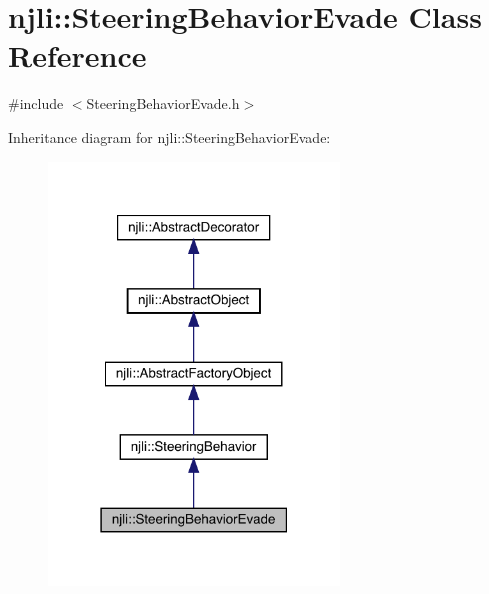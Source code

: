 \hypertarget{classnjli_1_1_steering_behavior_evade}{}\section{njli\+:\+:Steering\+Behavior\+Evade Class Reference}
\label{classnjli_1_1_steering_behavior_evade}


{\ttfamily \#include $<$Steering\+Behavior\+Evade.\+h$>$}



Inheritance diagram for njli\+:\+:Steering\+Behavior\+Evade\+:\nopagebreak
\begin{figure}[H]
\begin{center}
\leavevmode
\includegraphics[width=219pt]{classnjli_1_1_steering_behavior_evade__inherit__graph}
\end{center}
\end{figure}


